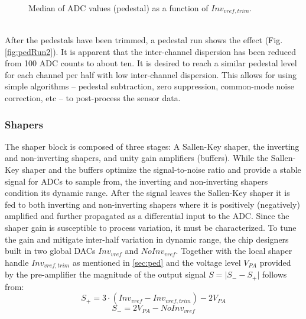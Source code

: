 \documentclass[../../main.tex]{subfiles}
\begin{document}
\begin{figure}[htp]
	\caption{Median of ADC values (pedestal) as a function of $Inv_{vref,trim}$.}
	\label{fig:pedScan}
\end{figure}
\\
After the pedestals have been trimmed, a pedestal run shows the effect (Fig. \ref{fig:pedRun2}). It is apparent that the inter-channel dispersion has been reduced from 100 ADC counts to about ten. It is desired to reach a similar pedestal level for each channel per half with low inter-channel dispersion. This allows for using simple algorithms -- pedestal subtraction, zero suppression, common-mode noise correction, etc -- to post-process the sensor data.

\subsubsection{Shapers}\label{sec:shaper}
The shaper block is composed of three stages: A Sallen-Key shaper, the inverting and non-inverting shapers, and unity gain amplifiers (buffers). While the Sallen-Key shaper and the buffers optimize the signal-to-noise ratio \cite{tdr_roc} and provide a stable signal for ADCs to sample from, the inverting and non-inverting shapers condition its dynamic range. After the signal leaves the Sallen-Key shaper it is fed to both inverting and non-inverting shapers where it is positively (negatively) amplified and further propagated as a differential input to the ADC. Since the shaper gain is susceptible to process variation, it must be characterized. To tune the gain and mitigate inter-half variation in dynamic range, the chip designers built in two global DACs $Inv_{vref}$ and $NoInv_{vref}$. Together with the local shaper handle $Inv_{vref,trim}$ as mentioned in \ref{sec:ped} and the voltage level $V_{PA}$ provided by the pre-amplifier the magnitude of the output signal $S=\lvert S_{-} - S_{+}\rvert$ follows from:
\begin{equation}
	S_{+} = 3\cdot(Inv_{vref}-Inv_{vref,trim})-2V_{PA}
\end{equation}
\begin{equation}
	S_{-} = 2V_{PA}-NoInv_{vref}
\end{equation}
\end{document}
